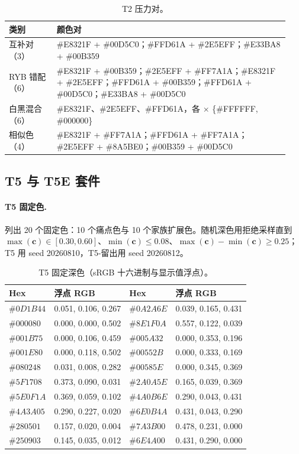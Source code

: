 \begin{table}[t]
\centering
\footnotesize
\setlength{\tabcolsep}{3pt}
\caption{T2 压力对。}
\label{tab:t2}
\begin{tabular}{p{0.16\linewidth}p{0.78\linewidth}}
\toprule
类别 & 颜色对 \\
\midrule
互补对（3） & \#E8321F + \#00D5C0；\#FFD61A + \#2E5EFF；\#E33BA8 + \#00B359 \\
RYB 错配（6） & \#E8321F + \#00B359；\#2E5EFF + \#FF7A1A；\#E8321F + \#2E5EFF；\#FFD61A + \#00B359；\#FFD61A + \#00D5C0；\#E33BA8 + \#00D5C0 \\
白黑混合（6） & \#E8321F、\#2E5EFF、\#FFD61A，各 $\times$ \{\#FFFFFF, \#000000\} \\
相似色（4） & \#E8321F + \#FF7A1A；\#FFD61A + \#FF7A1A；\#2E5EFF + \#8A5BE0；\#00B359 + \#00D5C0 \\
\bottomrule
\end{tabular}
\end{table}

\subsection{T5 与 T5E 套件}
\label{app:t5}

\paragraph{T5 固定色.}
 列出 20 个固定色：10 个痛点色与 10 个家族扩展色。随机深色用拒绝采样直到 $\max(\mathbf{c})\in[0.30,0.60]$、$\min(\mathbf{c})\le0.08$、$\max(\mathbf{c})-\min(\mathbf{c})\ge0.25$；T5 用 seed 20260810，T5-留出用 seed 20260812。

\begin{table}[t]
\centering
\small
\caption{T5 固定深色（sRGB 十六进制与显示值浮点）。}
\label{tab:t5colors}
\begin{tabular}{llll}
\toprule
Hex & 浮点 RGB & Hex & 浮点 RGB \\
\midrule
$\#0D1B44$ & 0.051, 0.106, 0.267 & $\#0A2A6E$ & 0.039, 0.165, 0.431 \\
$\#000080$ & 0.000, 0.000, 0.502 & $\#8E1F0A$ & 0.557, 0.122, 0.039 \\
$\#001B75$ & 0.000, 0.106, 0.459 & $\#005A32$ & 0.000, 0.353, 0.196 \\
$\#001E80$ & 0.000, 0.118, 0.502 & $\#00552B$ & 0.000, 0.333, 0.169 \\
$\#080248$ & 0.031, 0.008, 0.282 & $\#00585E$ & 0.000, 0.345, 0.369 \\
$\#5F1708$ & 0.373, 0.090, 0.031 & $\#2A0A5E$ & 0.165, 0.039, 0.369 \\
$\#5E0F1A$ & 0.369, 0.059, 0.102 & $\#4A0B6E$ & 0.290, 0.043, 0.431 \\
$\#4A3A05$ & 0.290, 0.227, 0.020 & $\#6E0B4A$ & 0.431, 0.043, 0.290 \\
$\#280501$ & 0.157, 0.020, 0.004 & $\#7A3B00$ & 0.478, 0.231, 0.000 \\
$\#250903$ & 0.145, 0.035, 0.012 & $\#6E4A00$ & 0.431, 0.290, 0.000 \\
\bottomrule
\end{tabular}
\end{table}

